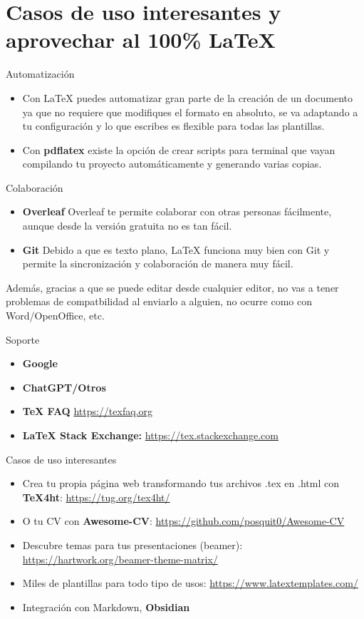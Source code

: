 \section{Casos de uso interesantes y aprovechar al 100\% \LaTeX}

\begin{frame}{Automatización}
  \begin{itemize}
    \item Con \alert{\LaTeX{}} puedes automatizar gran parte de la creación de un documento ya que no requiere que modifiques el formato en absoluto, se va adaptando a tu configuración y lo que escribes es flexible para todas las plantillas.
    \item Con \textbf{pdflatex} existe la opción de crear scripts para terminal que vayan compilando tu proyecto automáticamente y generando varias copias.
  \end{itemize}
\end{frame}

\begin{frame}[fragile]{Colaboración}
  \begin{itemize}
    \item \textbf{Overleaf}
        Overleaf te permite colaborar con otras personas fácilmente, aunque desde la versión gratuita no es tan fácil.
    \item \textbf{Git}
        Debido a que es texto plano, LaTeX funciona muy bien con Git y permite la sincronización y colaboración de manera muy fácil.
  \end{itemize}
  Además, gracias a que se puede editar desde cualquier editor, no vas a tener problemas de compatbilidad al enviarlo a alguien, no ocurre como con Word/OpenOffice, etc.
\end{frame}
\begin{frame}[fragile]{Soporte}
  \begin{itemize}
    \item \textbf{Google}
    \item \textbf{ChatGPT/Otros}
    \item \textbf{TeX FAQ} \url{https://texfaq.org}
    \item \textbf{LaTeX Stack Exchange:} \url{https://tex.stackexchange.com}
  \end{itemize}
\end{frame}
\begin{frame}[fragile]{Casos de uso interesantes}
  \begin{itemize}
    \item Crea tu propia página web transformando tus archivos .tex en .html con \textbf{TeX4ht}: \url{https://tug.org/tex4ht/}
    \item O tu CV con \textbf{Awesome-CV}: \url{https://github.com/posquit0/Awesome-CV}
    \item Descubre temas para tus presentaciones (beamer): \url{https://hartwork.org/beamer-theme-matrix/}
    \item Miles de plantillas para todo tipo de usos: \url{https://www.latextemplates.com/}
    \item Integración con Markdown, \textbf{Obsidian}
  \end{itemize}
\end{frame}
